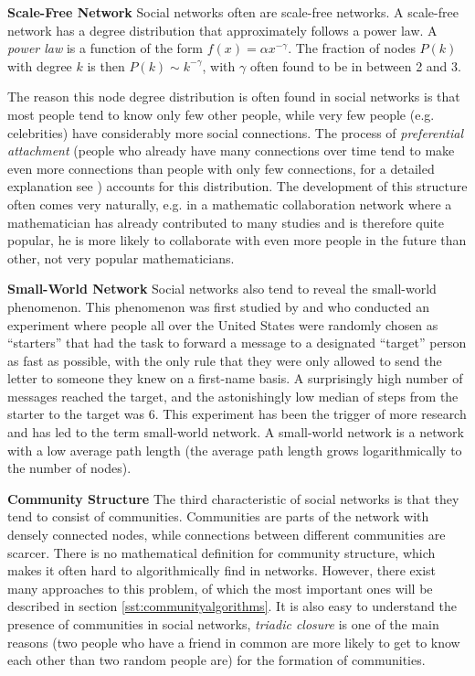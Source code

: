 \textbf{Scale-Free Network} Social networks often are scale-free networks. A scale-free network has a degree distribution that approximately follows a power law. A \textit{power law} is a function of the form $f(x) = \alpha x^{-\gamma}$. The fraction of nodes $P(k)$ with degree $k$ is then $P(k) \sim k^{-\gamma}$, with $\gamma$ often found to be in between 2 and 3.

The reason this node degree distribution is often found in social networks is that most people tend to know only few other people, while very few people (e.g. celebrities) have considerably more social connections. The process of \textit{preferential attachment} (people who already have many connections over time tend to make even more connections than people with only few connections, for a detailed explanation see \cite{Easley_2010}) accounts for this distribution. The development of this structure often comes very naturally, e.g. in a mathematic collaboration network where a mathematician has already contributed to many studies and is therefore quite popular, he is more likely to collaborate with even more people in the future than other, not very popular mathematicians.
\newline

\textbf{Small-World Network} Social networks also tend to reveal the small-world phenomenon. This phenomenon was first studied by \cite{Milgram_1967} and \cite{Travers_1969} who conducted an experiment where people all over the United States were randomly chosen as ``starters'' that had the task to forward a message to a designated ``target'' person as fast as possible, with the only rule that they were only allowed to send the letter to someone they knew on a first-name basis. A surprisingly high number of messages reached the target, and the astonishingly low median of steps from the starter to the target was 6. This experiment has been the trigger of more research and has led to the term small-world network. A small-world network is a network with a low average path length (the average path length grows logarithmically to the number of nodes).
\newline

\textbf{Community Structure} The third characteristic of social networks is that they tend to consist of communities. Communities are parts of the network with densely connected nodes, while connections between different communities are scarcer. There is no mathematical definition for community structure, which makes it often hard to algorithmically find in networks. However, there exist many approaches to this problem, of which the most important ones will be described in section \ref{sst:communityalgorithms}. It is also easy to understand the presence of communities in social networks, \textit{triadic closure} \cite{Easley_2010} is one of the main reasons (two people who have a friend in common are more likely to get to know each other than two random people are) for the formation of communities.

